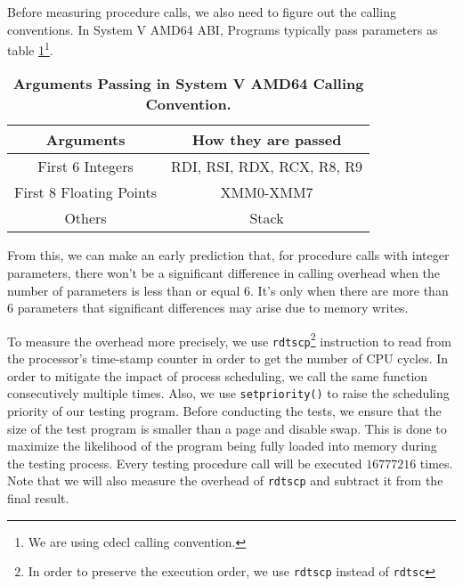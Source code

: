 Before measuring procedure calls, we also need to figure out the calling conventions. In System V AMD64 ABI, Programs typically pass parameters as table \ref{table:calling-convention-reg}\footnote{We are using cdecl calling convention.}.
\begin{table}[h]
	\centering
	\begin{tabular}{c|c}
		\hline
		\bf{Arguments} & \bf{How they are passed} \\ \hline
		
		First 6 Integers & RDI, RSI, RDX, RCX, R8, R9 \\ \hline

		First 8 Floating Points & XMM0-XMM7 \\ \hline
		
		Others & Stack \\ \hline
	\end{tabular}
	\caption{\textbf{Arguments Passing in System V AMD64 Calling Convention.}}
	\label{table:calling-convention-reg}
\end{table}
From this, we can make an early prediction that, for procedure calls with integer parameters, there won't be a significant difference in calling overhead when the number of parameters is less than or equal 6. It's only when there are more than 6 parameters that significant differences may arise due to memory writes.

To measure the overhead more precisely, we use \texttt{rdtscp}\footnote{In order to preserve the execution order, we use \texttt{rdtscp} instead of \texttt{rdtsc}} instruction to read from the processor’s time-stamp counter in order to get the number of CPU cycles. In order to mitigate the impact of process scheduling, we call the same function consecutively multiple times. Also, we use \texttt{setpriority()} to raise the scheduling priority of our testing program. Before conducting the tests, we ensure that the size of the test program is smaller than a page and disable swap. This is done to maximize the likelihood of the program being fully loaded into memory during the testing process. Every testing procedure call will be executed $16777216$ times. Note that we will also measure the overhead of \texttt{rdtscp} and subtract it from the final result. 


